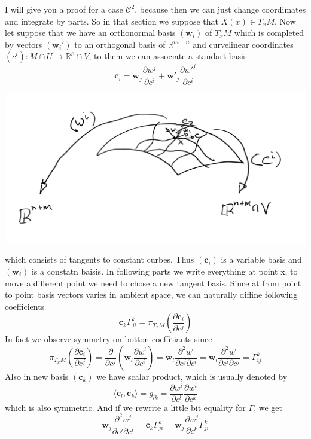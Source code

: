 \vspace{2ex}
I will give you a proof for a case $\mathcal C^2$, because then we can just change
coordimates and integrate by parts. So in that section we suppose that $X(x)\in
T_xM$. Now let suppose that we have an orthonormal basis $(\mathbf w_i)$ of $T_xM$
which is completed by vectors $(\mathbf w_i')$ to an orthogonal basis of
$\mathbb R^{m+n}$ and curvelinear
coordinates $(c^i):M\cap U\rightarrow \mathbb{R^n}\cap V$, to them we can
associate a standart basis 
\[\mathbf{c}_i=\mathbf{w}_j\frac{\partial w^j}{\partial c^i}+\mathbf{w'}_j\frac{\partial w'^j}{\partial c^i}\]
\begin{center}
\includegraphics[scale=0.2]{maps.png}
\end{center}
which consists of tangents to constant curbes. Thus $(\mathbf c_i)$ is a variable
basis and $(\mathbf w_i)$ is a constatn baisis. In following parts we write
everything at point x, to move a different point we need to chose a new tangent basis. Since at from point to point
basis vectors varies in ambient space, we can naturally diffine following coefficients
\[\mathbf c_k\Gamma_{ji}^k=\pi_{T_x M}(\frac{\partial\mathbf{c}_i}{\partial c^j})\]
In fact we observe symmetry on botton coeffitiants since
\[\pi_{T_xM}(\frac{\partial\mathbf{c}_i}{\partial c^j}) = \frac{\partial}{\partial c^j}(\mathbf{w}_l\frac{\partial w^l}{\partial c^i})
=\mathbf{w}_l\frac{\partial^2 w^l}{\partial c^j\partial c^i}=\mathbf{w}_l\frac{\partial^2 w^l}{\partial c^i\partial c^j}
=\Gamma_{ij}^k\]
Also in new basis $(\mathbf{c}_k)$ we have scalar product, which is usually denoted by
\[\langle\mathbf{c}_l,\mathbf{c}_k\rangle=g_{lk}=\frac{\partial w^i}{\partial c^l}\frac{\partial w^i}{\partial c^k}\]
which is also symmetric. And if we rewrite a little bit equality for $\Gamma$, we get
\[\mathbf{w}_j\frac{\partial^2 w^j}{\partial c^j\partial c^i}=\mathbf{c}_k\Gamma_{ji}^k
=\mathbf{w}_j\frac{\partial w^j}{\partial c^k}\Gamma_{ji}^k\]
